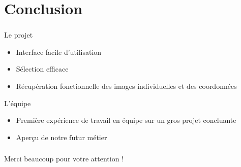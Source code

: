 \documentclass[11pt]{beamer}
\begin{document}
\section{Conclusion}
\begin{frame}
\frametitle{\secname}
	\begin{block}{Le projet}
		\begin{itemize}
			\item Interface facile d'utilisation
			\item Sélection efficace
			\item Récupération fonctionnelle des images individuelles et des coordonnées 
		\end{itemize}
	\end{block}
	\begin{block}{L'équipe}
		\begin{itemize}
			\item Première expérience de travail en équipe sur un gros projet concluante
			\item Aperçu de notre futur métier
		\end{itemize}
	\end{block}
\end{frame}
\begin{frame}
	\frametitle{}
	\begin{block}{}
		\begin{center}
			Merci beaucoup pour votre attention ! %
		\end{center}
	\end{block}
\end{frame}
\end{document}
